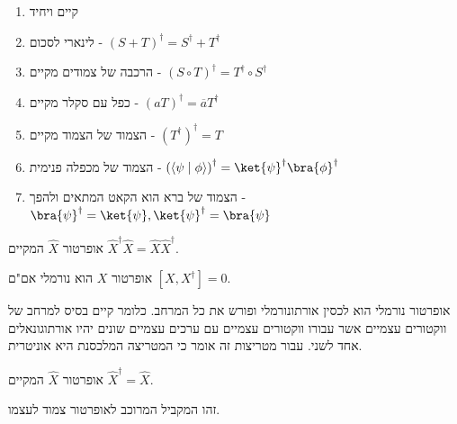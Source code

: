 \documentclass{tstextbook}
\begin{document}
\begin{proposition}
  \begin{enumerate}
    \item קיים ויחיד 


    \item לינארי לסכום - \((S+T)^{\dagger}=S^{\dagger}+T^{\dagger}\)


    \item הרכבה של צמודים מקיים - \(\left( S\circ T \right)^{\dagger}=T^{\dagger}\circ S^{\dagger}\)


    \item כפל עם סקלר מקיים - \((aT)^{\dagger}=\overline{a}T^{\dagger}\)


    \item הצמוד של הצמוד  מקיים - \(\left( T^{\dagger} \right)^{\dagger}=T\)


    \item הצמוד של מכפלה פנימית - \(\left( \left\langle  \psi \mid \phi  \right\rangle \right)^{\dagger}=\ket{\psi}^{\dagger}\bra{\phi}^{\dagger}\)


    \item הצמוד של ברא הוא הקאט המתאים ולהפך - \(\bra{\psi}^{\dagger}=\ket{\psi},\ket{\psi}^{\dagger}=\bra{\psi}\)


  \end{enumerate}
\end{proposition}
\begin{definition}
אופרטור \(\hat{X}\) המקיים \(\hat{X}^{\dagger}\hat{X}=\hat{X}\hat{X}^{\dagger}\).

\end{definition}
\begin{corollary}
אופרטור \(X\) הוא נורמלי אם"ם \(\left[ X,X^{\dagger} \right]=0\).

\end{corollary}
\begin{proposition}
אופרטור נורמלי הוא לכסין אורתונורמלי ופורש את כל המרחב. כלומר קיים בסיס למרחב של ווקטורים עצמיים אשר עבורו ווקטורים עצמיים עם ערכים עצמיים שונים יהיו אורתוגונאלים אחד לשני. עבור מטריצות זה אומר כי המטריצה המלכסנת היא אוניטרית.

\end{proposition}
\begin{definition}
אופרטור \(\hat{X}\) המקיים \(\hat{X}^{\dagger}=\hat{X}\).

\end{definition}
\begin{remark}
זהו המקביל המרוכב לאופרטור צמוד לעצמו.

\end{remark}
\end{document}
